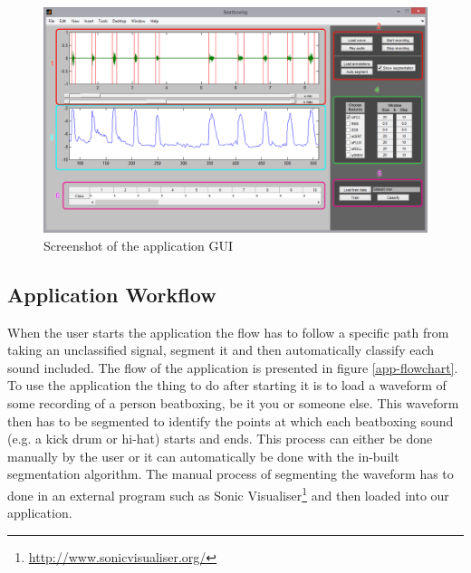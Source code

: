 \begin{figure}
\begin{center}
\includegraphics[width=\textwidth]{fig/Application.png}
\caption{Screenshot of the application GUI}
\label{app-gui}
\end{center}
\end{figure}

\subsection{Application Workflow}
When the user starts the application the flow has to follow a specific path from taking an unclassified signal, segment it and then automatically classify each sound included. The flow of the application is presented in figure \ref{app-flowchart}. To use the application the thing to do after starting it is to load a waveform of some recording of a person beatboxing, be it you or someone else. This waveform then has to be segmented to identify the points at which each beatboxing sound (e.g. a kick drum or hi-hat) starts and ends. This process can either be done manually by the user or it can automatically be done with the in-built segmentation algorithm. The manual process of segmenting the waveform has to done in an external program such as Sonic Visualiser\footnote{\url{http://www.sonicvisualiser.org/}} and then loaded into our application.


